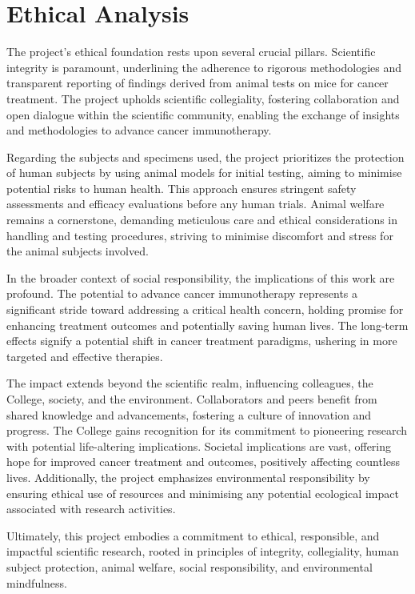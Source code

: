 \documentclass[11pt]{article}
\begin{document}
\section{Ethical Analysis}
The project's ethical foundation rests upon several crucial pillars. Scientific integrity is paramount, underlining the adherence to rigorous methodologies and transparent reporting of findings derived from animal tests on mice for cancer treatment. The project upholds scientific collegiality, fostering collaboration and open dialogue within the scientific community, enabling the exchange of insights and methodologies to advance cancer immunotherapy.

Regarding the subjects and specimens used, the project prioritizes the protection of human subjects by using animal models for initial testing, aiming to minimise potential risks to human health. This approach ensures stringent safety assessments and efficacy evaluations before any human trials. Animal welfare remains a cornerstone, demanding meticulous care and ethical considerations in handling and testing procedures, striving to minimise discomfort and stress for the animal subjects involved.

In the broader context of social responsibility, the implications of this work are profound. The potential to advance cancer immunotherapy represents a significant stride toward addressing a critical health concern, holding promise for enhancing treatment outcomes and potentially saving human lives. The long-term effects signify a potential shift in cancer treatment paradigms, ushering in more targeted and effective therapies.

The impact extends beyond the scientific realm, influencing colleagues, the College, society, and the environment. Collaborators and peers benefit from shared knowledge and advancements, fostering a culture of innovation and progress. The College gains recognition for its commitment to pioneering research with potential life-altering implications. Societal implications are vast, offering hope for improved cancer treatment and outcomes, positively affecting countless lives. Additionally, the project emphasizes environmental responsibility by ensuring ethical use of resources and minimising any potential ecological impact associated with research activities.

Ultimately, this project embodies a commitment to ethical, responsible, and impactful scientific research, rooted in principles of integrity, collegiality, human subject protection, animal welfare, social responsibility, and environmental mindfulness.
\pagebreak
\end{document}

